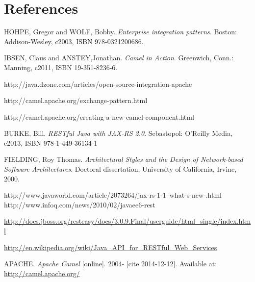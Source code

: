 \documentclass[12pt,final,oneside]{fithesis2}
\begin{document}

\begingroup
\def\tmpchapter{0}
\renewcommand{\chaptername}{}
\renewcommand{\thechapter}{}
\chapter{References}
\renewcommand{\chapter}[2]{}%




\begin{thebibliography}{}
 HOHPE, Gregor and WOLF, Bobby. \textit{Enterprise integration patterns}. Boston: Addison-Wesley, c2003, ISBN 978-0321200686.

 IBSEN, Claus and ANSTEY,Jonathan. \textit{Camel in Action}. Greenwich, Conn.: Manning, c2011, ISBN 19-351-8236-6.

 http://java.dzone.com/articles/open-source-integration-apache

 http://camel.apache.org/exchange-pattern.html

 http://camel.apache.org/creating-a-new-camel-component.html

 BURKE, Bill. \textit{RESTful Java with JAX-RS 2.0}. Sebastopol: O'Reilly Media, c2013, ISBN 978-1-449-36134-1

 FIELDING, Roy Thomas. \textit{Architectural Styles and the Design of Network-based Software Architectures}. Doctoral dissertation, University of California, Irvine, 2000. 

 http://www.javaworld.com/article/2073264/jax-rs-1-1--what-s-new-.html
 http://www.infoq.com/news/2010/02/javaee6-rest

\url{http://docs.jboss.org/resteasy/docs/3.0.9.Final/userguide/html_single/index.html}

 \url{http://en.wikipedia.org/wiki/Java_API_for_RESTful_Web_Services}

 APACHE. \textit{Apache Camel} [online]. 2004- [cite 2014-12-12]. Available at: \url{http://camel.apache.org/}


\end{thebibliography}
\end{document}
